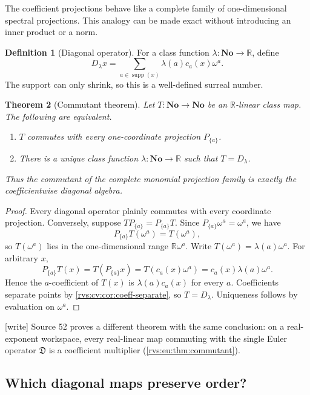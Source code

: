 \documentclass[11pt,letterpaper]{article}
\numberwithin{equation}{section}
\newtheorem{theorem}{Theorem}[section]
\theoremstyle{definition}
\newtheorem{definition}[theorem]{Definition}
\theoremstyle{remark}
\newcommand{\No}{\mathbf{No}}
\newcommand{\R}{\mathbb{R}}
\newcommand{\supp}{\operatorname{supp}}
\newcommand{\EuD}{\mathfrak D}%
\newcommand{\wtag}{\textup{[write]}}%
\begin{document}
The coefficient projections behave like a complete family of one-dimensional
spectral projections. This analogy can be made exact without introducing an inner
product or a norm.

\begin{definition}[Diagonal operator]
For a class function $\lambda:\No\to\R$, define
\begin{equation}\label{rvs:cv:eq:diagonal-operator}
  D_\lambda x=\sum_{a\in\supp(x)}\lambda(a)c_a(x)\omega^a.
\end{equation}
The support can only shrink, so this is a well-defined surreal number.
\end{definition}
\begin{theorem}[Commutant theorem]\label{rvs:cv:thm:commutant}
Let $T:\No\to\No$ be an $\R$-linear class map. The following are equivalent.
\begin{enumerate}[label=(\roman*)]
\item $T$ commutes with every one-coordinate projection $P_{\{a\}}$.
\item There is a unique class function $\lambda:\No\to\R$ such that
$T=D_\lambda$.
\end{enumerate}
Thus the commutant of the complete monomial projection family is exactly the
coefficientwise diagonal algebra.
\end{theorem}

\begin{proof}
Every diagonal operator plainly commutes with every coordinate projection.
Conversely, suppose $T P_{\{a\}}=P_{\{a\}}T$. Since
$P_{\{a\}}\omega^a=\omega^a$, we have
\[
  P_{\{a\}}T(\omega^a)=T(\omega^a),
\]
so $T(\omega^a)$ lies in the one-dimensional range $\R\omega^a$. Write
$T(\omega^a)=\lambda(a)\omega^a$. For arbitrary $x$,
\[
  P_{\{a\}}T(x)=T(P_{\{a\}}x)
   =T(c_a(x)\omega^a)
   =c_a(x)\lambda(a)\omega^a.
\]
Hence the $a$-coefficient of $T(x)$ is $\lambda(a)c_a(x)$ for every $a$.
Coefficients separate points by \cref{rvs:cv:cor:coeff-separate}, so $T=D_\lambda$.
Uniqueness follows by evaluation on $\omega^a$.
\end{proof}

\noindent\wtag{} Source 52 proves a different theorem with the same
conclusion: on a real-exponent workspace, every real-linear map commuting
with the single Euler operator \(\EuD\) is a coefficient multiplier
(\cref{rvs:eu:thm:commutant}).

\subsection{Which diagonal maps preserve order?}
\end{document}
